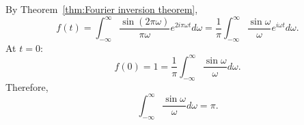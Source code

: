 \documentclass[a4paper]{article}
\theoremstyle{definition}
\begin{document}
By Theorem~\ref{thm:Fourier inversion theorem},
\begin{equation*}
    f(t) = \int_{-\infty}^{\infty} \frac{\sin(2\pi \omega)}{\pi\omega} e^{2i\pi\omega t} d\omega = \frac{1}{\pi} \int_{-\infty}^{\infty} \frac{\sin \omega}{\omega} e^{i\omega t} d\omega.
\end{equation*}
At $t=0$:
\begin{equation*}
    f(0) = 1 = \frac{1}{\pi} \int_{-\infty}^{\infty} \frac{\sin \omega}{\omega} d\omega.
\end{equation*}
Therefore,
\begin{equation*}
    \int_{-\infty}^{\infty} \frac{\sin \omega}{\omega} d\omega = \pi.
\end{equation*}
\end{document}
